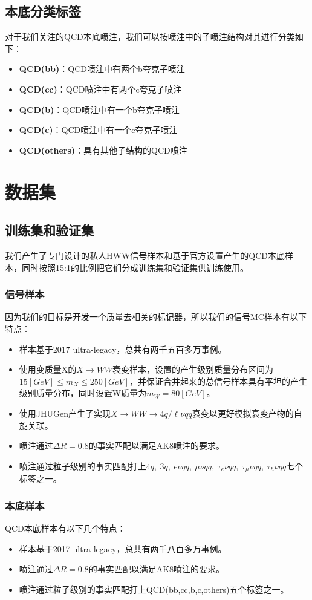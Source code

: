 \subsection{本底分类标签}
对于我们关注的QCD本底喷注，我们可以按喷注中的子喷注结构对其进行分类如下：
\begin{itemize}\label{eq:5.2}
    \item \textbf{QCD(bb)}：QCD喷注中有两个b夸克子喷注
    \item \textbf{QCD(cc)}：QCD喷注中有两个c夸克子喷注
    \item \textbf{QCD(b)}：QCD喷注中有一个b夸克子喷注
    \item \textbf{QCD(c)}：QCD喷注中有一个c夸克子喷注
    \item \textbf{QCD(others)}：具有其他子结构的QCD喷注
\end{itemize}

\section{数据集}
\subsection{训练集和验证集}
我们产生了专门设计的私人HWW信号样本和基于官方设置产生的QCD本底样本，同时按照15:1的比例把它们分成训练集和验证集供训练使用。
\subsubsection{信号样本}
因为我们的目标是开发一个质量去相关的标记器，所以我们的信号MC样本有以下特点：
\begin{itemize}
    \item 样本基于2017 ultra-legacy，总共有两千五百多万事例。
    \item 使用变质量X的$X\to WW$衰变样本，设置的产生级别质量分布区间为$15 [\si{GeV}]\leq m_X\leq 250[\si{GeV}]$，并保证合并起来的总信号样本具有平坦的产生级别质量分布，同时设置W质量为$m_W=80[\si{GeV}]$。
    \item 使用JHUGen产生子实现$X\to WW\to4q/\ell \nu qq$衰变以更好模拟衰变产物的自旋关联。
    \item 喷注通过$\Delta R=0.8$的事实匹配以满足AK8喷注的要求。
    \item 喷注通过粒子级别的事实匹配打上$4q,\ 3q,\ e\nu qq,\ \mu\nu qq,\ \tau_e\nu qq,\ \tau_\mu\nu qq,\ \tau_h\nu qq$七个标签之一。
\end{itemize}

\subsubsection{本底样本}
QCD本底样本有以下几个特点：
\begin{itemize}
    \item 样本基于2017 ultra-legacy，总共有两千八百多万事例。
    \item 喷注通过$\Delta R=0.8$的事实匹配以满足AK8喷注的要求。
    \item 喷注通过粒子级别的事实匹配打上QCD(bb,cc,b,c,others)五个标签之一。
\end{itemize}

